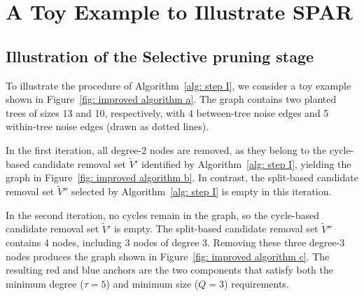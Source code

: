 \documentclass[twoside,11pt]{article}
\theoremstyle{remark}
\begin{document}
\section{A Toy Example to Illustrate SPAR}
\label{sec: toy example}

\subsection{Illustration of the Selective pruning stage}

To illustrate the procedure of Algorithm~\ref{alg: step I}, we consider a toy example shown in Figure~\ref{fig: improved algorithm a}. 
The graph contains two planted trees of sizes 13 and 10, respectively, with 4 between-tree noise edges and 5 within-tree noise edges (drawn as dotted lines).

In the first iteration, all degree-2 nodes are removed, as they belong to the cycle-based candidate removal set $\tilde{V}'$ identified by Algorithm~\ref{alg: step I}, yielding the graph in Figure~\ref{fig: improved algorithm b}. 
In contrast, the split-based candidate removal set $\tilde{V}''$ selected by Algorithm~\ref{alg: step I} is empty in this iteration.

In the second iteration, no cycles remain in the graph, so the cycle-based candidate removal set $\tilde{V}'$ is empty. 
The split-based candidate removal set $\tilde{V}''$ contains 4 nodes, including 3 nodes of degree 3. 
Removing these three degree-3 nodes produces the graph shown in Figure~\ref{fig: improved algorithm c}. 
The resulting red and blue anchors are the two components that satisfy both the minimum degree ($\tau = 5$) and minimum size ($Q = 3$) requirements.
\end{document}
